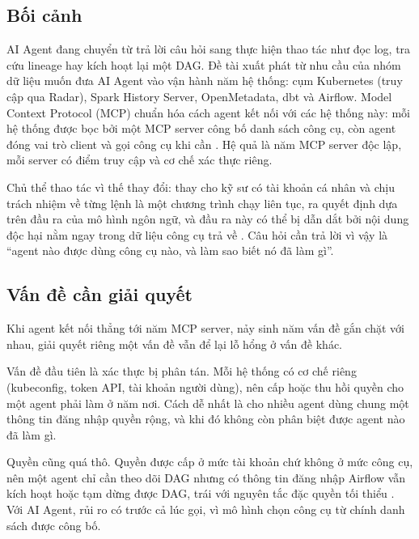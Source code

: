 
\subsection{Bối cảnh}

AI Agent đang chuyển từ trả lời câu hỏi sang thực hiện thao tác như đọc log, tra cứu lineage hay kích hoạt lại một DAG. Đề tài xuất phát từ nhu cầu của nhóm dữ liệu muốn đưa AI Agent vào vận hành năm hệ thống: cụm Kubernetes (truy cập qua Radar), Spark History Server, OpenMetadata, dbt và Airflow. Model Context Protocol (MCP) chuẩn hóa cách agent kết nối với các hệ thống này: mỗi hệ thống được bọc bởi một MCP server công bố danh sách công cụ, còn agent đóng vai trò client và gọi công cụ khi cần \parencite{mcp_spec}. Hệ quả là năm MCP server độc lập, mỗi server có điểm truy cập và cơ chế xác thực riêng.

Chủ thể thao tác vì thế thay đổi: thay cho kỹ sư có tài khoản cá nhân và chịu trách nhiệm về từng lệnh là một chương trình chạy liên tục, ra quyết định dựa trên đầu ra của mô hình ngôn ngữ, và đầu ra này có thể bị dẫn dắt bởi nội dung độc hại nằm ngay trong dữ liệu công cụ trả về \parencite{breakingmcp}. Câu hỏi cần trả lời vì vậy là ``agent nào được dùng công cụ nào, và làm sao biết nó đã làm gì''.

\subsection{Vấn đề cần giải quyết}

Khi agent kết nối thẳng tới năm MCP server, nảy sinh năm vấn đề gắn chặt với nhau, giải quyết riêng một vấn đề vẫn để lại lỗ hổng ở vấn đề khác.

Vấn đề đầu tiên là xác thực bị phân tán. Mỗi hệ thống có cơ chế riêng (kubeconfig, token API, tài khoản người dùng), nên cấp hoặc thu hồi quyền cho một agent phải làm ở năm nơi. Cách dễ nhất là cho nhiều agent dùng chung một thông tin đăng nhập quyền rộng, và khi đó không còn phân biệt được agent nào đã làm gì.

Quyền cũng quá thô. Quyền được cấp ở mức tài khoản chứ không ở mức công cụ, nên một agent chỉ cần theo dõi DAG nhưng có thông tin đăng nhập Airflow vẫn kích hoạt hoặc tạm dừng được DAG, trái với nguyên tắc đặc quyền tối thiểu \parencite{saltzer1975protection}. Với AI Agent, rủi ro có trước cả lúc gọi, vì mô hình chọn công cụ từ chính danh sách được công bố.

